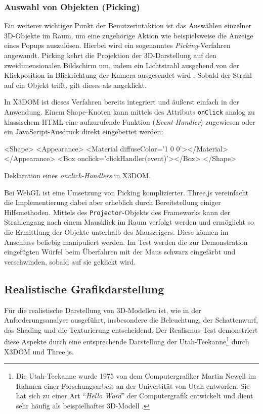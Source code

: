 \subsubsection{Auswahl von Objekten (Picking)}

Ein weiterer wichtiger Punkt der Benutzerintaktion ist das Auswählen einzelner 3D-Objekte im Raum, um eine zugehörige Aktion wie beispielsweise die Anzeige eines Popups auszulösen. Hierbei wird ein sogenanntes \emph{Picking}-Verfahren angewandt. Picking kehrt die Projektion der 3D-Darstellung auf den zweidimensionalen Bildschirm um, indem ein Lichtstrahl ausgehend von der Klickposition in Blickrichtung der Kamera ausgesendet wird \autocite{THREEJS_PICKING}. Sobald der Strahl auf ein Objekt trifft, gilt dieses als angeklickt.

In X3DOM ist dieses Verfahren bereits integriert und äußerst einfach in der Anwendung. Einem Shape-Knoten kann mittels des Attributs \texttt{onClick} analog zu klassischem HTML eine aufzurufende Funktion (\emph{Event-Handler}) zugewiesen oder ein JavaScript-Ausdruck direkt eingebettet werden:

\smallskip
\begin{listing}[ht]
\begin{htmlcode}
<Shape>
	<Appearance>
		<Material diffuseColor='1 0 0'></Material>
	</Appearance>
	<Box onclick='clickHandler(event)'></Box>
</Shape>
\end{htmlcode}
\caption{Deklaration eines \emph{onclick-Handlers} in X3DOM.}
\label{LISTING:X3DOM_ONCLICK_HANDLER}
\end{listing}

Bei WebGL ist eine Umsetzung von Picking komplizierter. Three.js vereinfacht die Implementierung dabei aber erheblich durch Bereitstellung einiger Hilfsmethoden. Mittels des \texttt{Projector}-Objekts des Frameworks kann der Strahlengang nach einem Mausklick im Raum verfolgt werden und ermöglicht so die Ermittlung der Objekte unterhalb des Mauszeigers. Diese können im Anschluss beliebig manipuliert werden. Im Test werden die zur Demonstration eingefügten Würfel beim Überfahren mit der Maus schwarz eingefärbt und verschwinden, sobald auf sie geklickt wird.

\subsection{Realistische Grafikdarstellung}

Für die realistische Darstellung von 3D-Modellen ist, wie in der Anforderungsanalyse ausgeführt, insbesondere die Beleuchtung, der Schattenwurf, das Shading und die Texturierung entscheidend. Der Realismus-Test demonstriert diese Aspekte durch eine entsprechende Darstellung der Utah-Teekanne\footnote{Die Utah-Teekanne wurde 1975 von dem Computergrafiker Martin Newell im Rahmen einer Forschungsarbeit an der Universität von Utah entworfen. Sie hat sich zu einer Art \enquote{\em{Hello Word}} der Computergrafik entwickelt und dient sehr häufig als beispielhaftes 3D-Modell \autocite{UTAH_TEAPOT}.} durch X3DOM und Three.js.

